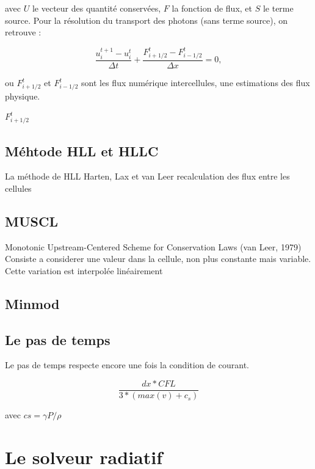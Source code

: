 avec $U$ le vecteur des quantité conservées, $F$ la fonction de flux, et $S$ le terme source. Pour la résolution du transport des photons (sans terme source), on retrouve :

\begin{equation}
\frac{ u^{t+1}_i - u^t_i }{\Delta t} + \frac{ F^t_{i+1/2} - F^t_{i-1/2} }{\Delta x} =0,
\label{eq:rad_solver}
\end{equation}

ou $F^t_{i+1/2}$ et $F^t_{i-1/2}$ sont les flux numérique intercellules, une estimations des flux physique.

$F^t_{i+1/2}$

\subsection{Méhtode HLL et HLLC }
La méthode de HLL Harten, Lax et van Leer 
recalculation des flux entre les cellules

\subsection{MUSCL}
Monotonic Upstream-Centered Scheme for Conservation Laws (van Leer, 1979)
Consiste a considerer une valeur dans la cellule, non plus constante mais variable.
Cette variation est interpolée linéairement

\subsection{Minmod}



\subsection{Le pas de temps}

Le pas de temps respecte encore une fois la condition de courant.

\begin{equation}
\frac{dx * CFL }{3*(max(v) + c_s)}
\end{equation}

avec $cs = \gamma P/\rho$


\clearpage
\section{Le solveur radiatif}
\label{sec:rad_solver}

